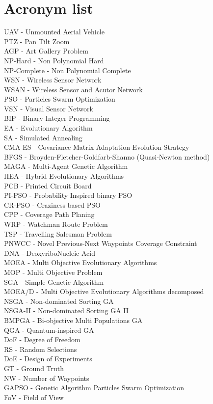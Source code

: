 \documentclass[english]{spimubphdthesis}
\begin{document}
\mainmatter
 \section{Acronym list}
UAV - Unmounted Aerial Vehicle \\
PTZ - Pan Tilt Zoom \\
AGP - Art Gallery Problem \\
NP-Hard - Non Polynomial Hard  \\ 
NP-Complete - Non Polynomial Complete  \\ 
WSN - Wireless Sensor Network \\
WSAN - Wireless Sensor and Acutor Network\\
PSO - Particles Swarm Optimization \\
VSN - Visual Sensor Network \\
BIP - Binary Integer Programming \\
EA - Evolutionary Algorithm \\
SA - Simulated Annealing \\
CMA-ES - Covariance Matrix Adaptation Evolution Strategy\\
BFGS - Broyden-Fletcher-Goldfarb-Shanno (Quasi-Newton method)\\
MAGA - Multi-Agent Genetic Algorithm \\
HEA - Hybrid Evolutionary Algorithms  \\
PCB - Printed Circuit Board  \\
PI-PSO  - Probability Inspired binary PSO \\
CR-PSO - Craziness based PSO  \\
CPP - Coverage Path Planing   \\
WRP - Watchman Route Problem \\ 
TSP - Travelling Salesman Problem \\ 
PNWCC - Novel Previous-Next Waypoints Coverage Constraint \\ 
DNA - DeoxyriboNucleic Acid \\
MOEA - Multi Objective Evolutionary Algorithms \\
MOP - Multi Objective Problem \\
SGA - Simple Genetic Algorithm  \\
MOEA/D - Multi Objective Evolutionary Algorithms  decomposed\\
NSGA - Non-dominated Sorting GA \\
NSGA-II - Non-dominated Sorting GA II \\
BMPGA - Bi-objective Multi Populations GA \\
QGA - Quantum-inspired GA \\
DoF - Degree of Freedom \\
RS - Random Selections \\
DoE - Design of Experiments \\
GT - Ground Truth \\
NW - Number of Waypoints \\
GAPSO -  Genetic Algorithm Particles Swarm Optimization  \\
FoV - Field of View \\
\end{document}
